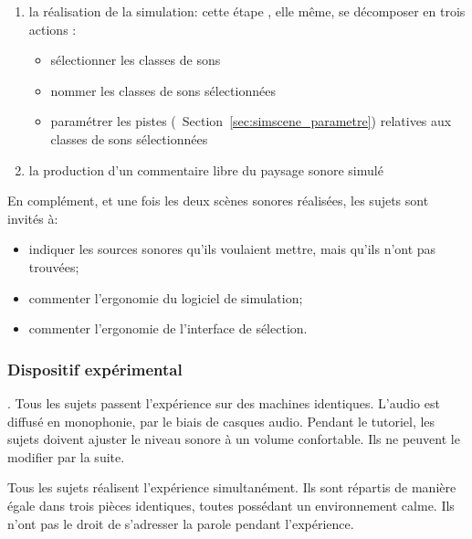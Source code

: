 \documentclass[twoside,twocolumn]{article}
\begin{document}
\begin{enumerate}
\item la réalisation de la simulation: cette étape   , elle même, se décomposer en trois actions :
\begin{itemize}
\item sélectionner les classes de sons
\item nommer les classes de sons sélectionnées
\item paramétrer les pistes (\cf~Section~\ref{sec:simscene_parametre}) relatives aux classes de sons sélectionnées
\end{itemize}
\item la production d'un commentaire libre du paysage sonore simulé
\end{enumerate}

En complément, et une fois les deux scènes sonores réalisées, les sujets sont invités à:

\begin{itemize}
\item indiquer les sources sonores qu'ils voulaient mettre, mais qu'ils n'ont pas trouvées;
\item commenter l’ergonomie du logiciel de simulation;
\item commenter l’ergonomie de l'interface de sélection.
\end{itemize}


\subsubsection*{Dispositif expérimental} 
.
Tous les sujets passent l'expérience sur des machines identiques. L'audio est diffusé en monophonie, par le biais de casques audio. Pendant le tutoriel, les sujets doivent ajuster le niveau sonore à un volume confortable. Ils ne peuvent le modifier par la suite.

Tous les sujets réalisent l'expérience simultanément. Ils sont répartis de manière égale dans trois pièces identiques, toutes possédant un environnement calme. Ils n'ont pas le droit de s'adresser la parole pendant l'expérience.
\end{document}

